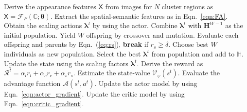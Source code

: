 \documentclass[letterpaper]{article} %
\newcommand\blue[1]{\textcolor{blue}{#1}}
\newcommand\rjf[1]{\textcolor{red}{\{RJF: #1\}}}
\begin{document}
\begin{algorithm}[ht]
\begin{algorithmic}[1]
    \STATE Derive the appearance features $\bm{\mathsf{X}}$ from images for $N$ cluster regions as $\bm{\mathsf{X}} 
   = \mathcal{F}_{P}\left(\mathbb{C}; \bm{\theta}\right)$. 
    \STATE Extract the spatial-semantic features as in Eqn.~\eqref{eqn:FA}. 
      \STATE Obtain the scaling actions $\bm{\lambda}^t$ by using the actor.
    \STATE Combine $\bm{\lambda}^t$ with $\bm{H}^{W-1}$ as the initial population. 
      \STATE Yield $W$ offspring by crossover and mutation.
      \STATE Evaluate each offspring and parents by Eqn.~(\ref{eq:rs}), \textbf{break} if $r_s \geq \delta$. 
      \STATE Choose best $W$ individuals as new population.
    \ENDFOR %
    \STATE Select the best $\bm{\lambda}^t$ from population and add to $\mathbb{H}$. 
    \STATE Update the state using the scaling factors $\bm{\lambda}^t$. 
    \STATE Derive the reward as $\mathcal{R}^t = \alpha_l r_l +\alpha_c r_c + \alpha_s r_s$. 
    \STATE Estimate the state-value $\mathcal{V}_\varphi\left(s^t\right)$.
    \STATE Evaluate the advantage function $\mathcal{A}(s^t, a^t)$.
    \STATE Update the actor model by using Eqn.~\eqref{eqn:actor_gradient}. 
    \STATE Update the critic model by using Eqn.~\eqref{eqn:critic_gradient}. 
  \ENDFOR
\ENDFOR
  
\end{algorithmic}
\end{algorithm}
\end{document}
